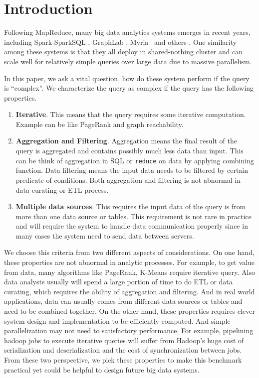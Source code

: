 \section{Introduction}

Following MapReduce, many big data analytics systems emerges in recent years, 
including Spark-SparkSQL \cite{XinRZFSS13SIGMOD, ZahariaCDDMMFSS12NSDI}, 
GraphLab \cite{GonzalezLGBG12OSDI}, Myria~\cite{HalperinACCKMORWWXBHS14SIGMOD} 
and others \cite{AbouzeidBARS09PVLDB,ThusooSJSCZALM10ICDE}. One similarity 
among these systems is that they all deploy in shared-nothing cluster and can 
scale well for relatively simple queries over large data due to massive 
parallelism. 

In this paper, we ask a vital question, how do these system perform if the
query is ``complex''. We characterize the query as complex if the query has 
the following properties.

\begin{enumerate}

\item \textbf{Iterative}. This means that the query requires some
iterative computation. Example can be like PageRank and graph reachability. 

\item \textbf{Aggregation and Filtering}. Aggregation means the final
result of the query is aggregated and contains possibly much less data
than input. This can be think of aggregation in SQL or \texttt{reduce} on data
by applying combining function. Data filtering means the input data needs to be
filtered by certain predicate of conditions. Both aggregation and filtering is 
not abnormal in data curating or ETL process.

\item \textbf{Multiple data sources}. This requires the input data of the 
query is from more than one data source or tables. This requirement is not
rare in practice and will require the system to handle data communication
properly since in many cases the system need to send data between servers.

\end{enumerate}

We choose this criteria from two different aspects of considerations. On one
 hand, these properties are not abnormal in analytic processes.
  For example, to 
get value from data, many algorithms like PageRank, K-Means require iterative
query. Also data analysts usually will spend a large portion of time to do ETL
or data curating, which requires the ability of aggregation and filtering. And 
in real world applications, data can usually comes from different data 
sources or tables and need to be combined together. On the other hand, these
properties requires clever system design and implementation to be efficiently
computed. And simple parallelization may not need to satisfactory 
performance. For example, pipelining hadoop jobs to execute iterative 
queries will suffer from Hadoop's huge cost of serialization and 
deserialization and the cost of synchronization between jobs. From these two 
perspective, we pick these properties to make this benchmark practical yet 
could be helpful to design future big data systems. 

